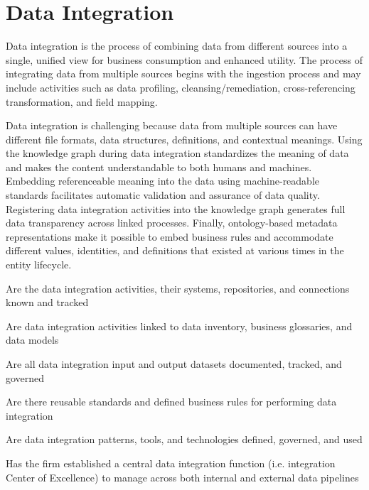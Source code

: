 \section{Data Integration}\label{sec:ekgmm-b-2-5} %

Data integration is the process of combining data from different sources into a single, unified view for
business consumption and enhanced utility.
The process of integrating data from multiple sources begins with the ingestion process and may include activities
such as data profiling, cleansing/remediation, cross-referencing transformation, and field mapping.

\ekgmmContextSection

Data integration is challenging because data from multiple sources can have different file formats, data structures,
definitions, and contextual meanings.
Using the knowledge graph during data integration standardizes the meaning of data and makes the content understandable
to both humans and machines.
Embedding referenceable meaning into the data using machine-readable standards facilitates automatic validation and
assurance of data quality.
Registering data integration activities into the knowledge graph generates full data transparency across
linked processes.
Finally, ontology-based metadata representations make it possible to embed business rules and accommodate
different values, identities, and definitions that existed at various times in the entity lifecycle.

\kgmmcorequestionssection

\begin{core-questions}

  \item [\thesection.1] Are the data integration activities, their systems, repositories, and connections
                        known and tracked
  \item [\thesection.2] Are data integration activities linked to data inventory, business glossaries, and data models
  \item [\thesection.3] Are all data integration input and output datasets documented, tracked, and governed
  \item [\thesection.4] Are there reusable standards and defined business rules for performing data integration
  \item [\thesection.5] Are data integration patterns, tools, and technologies defined, governed, and used
  \item [\thesection.6] Has the firm established a central data integration function
                        (i.e. integration Center of Excellence) to manage  across both
                        internal and external data pipelines
\end{core-questions}

